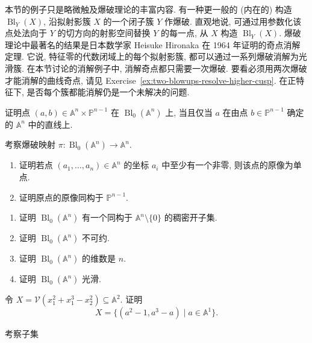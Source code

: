 本节的例子只是略微触及爆破理论的丰富内容. 有一种更一般的 (内在的) 构造 $\operatorname{Bl}_{Y}(X)$, 沿拟射影簇 $X$ 的一个闭子簇 $Y$ 作爆破. 直观地说, 可通过用参数化该点处法向于 $Y$ 的切方向的射影空间替换 $Y$ 的每一点, 从 $X$ 构造 $\operatorname{Bl}_{Y}(X)$. 爆破理论中最著名的结果是日本数学家 Heisuke Hironaka 在 1964 年证明的奇点消解定理. 它说, 特征零的代数闭域上的每个拟射影簇, 都可以通过一系列爆破消解为光滑簇. 在本节讨论的消解例子中, 消解奇点都只需要一次爆破. 要看必须用两次爆破才能消解的曲线奇点, 请见 Exercise~\ref{ex:two-blowups-resolve-higher-cusp}. 在正特征下, 是否每个簇都能消解仍是一个未解决的问题.

\BookExerciseHeading
\begin{BookExercises}
  \item\label{ex:blowup-incidence-condition-is-line-membership} 证明点 $(a,b)\in\mathbb{A}^{n}\times\mathbb{P}^{n-1}$ 在 $\operatorname{Bl}_{0}(\mathbb{A}^{n})$ 上, 当且仅当 $a$ 在由点 $b\in\mathbb{P}^{n-1}$ 确定的 $\mathbb{A}^{n}$ 中的直线上.
  \item\label{ex:fibres-of-blowup-of-affine-space-at-origin} 考察爆破映射 $\pi:\operatorname{Bl}_{0}(\mathbb{A}^{n})\to\mathbb{A}^{n}$.
  \begin{enumerate}
    \item 证明若点 $(a_{1},\ldots,a_{n})\in\mathbb{A}^{n}$ 的坐标 $a_{i}$ 中至少有一个非零, 则该点的原像为单点.
    \item 证明原点的原像同构于 $\mathbb{P}^{n-1}$.
  \end{enumerate}
  \item\label{ex:irreducibility-dimension-and-smoothness-of-affine-space-blowup}
  \begin{enumerate}
    \item 证明 $\operatorname{Bl}_{0}(\mathbb{A}^{n})$ 有一个同构于 $\mathbb{A}^{n}\setminus\{0\}$ 的稠密开子集.
    \item 证明 $\operatorname{Bl}_{0}(\mathbb{A}^{n})$ 不可约.
    \item 证明 $\operatorname{Bl}_{0}(\mathbb{A}^{n})$ 的维数是 $n$.
    \item 证明 $\operatorname{Bl}_{0}(\mathbb{A}^{n})$ 光滑.
  \end{enumerate}
  \item\label{ex:parametrize-nodal-affine-curve} 令 $X=\mathcal{V}(x_{1}^{2}+x_{1}^{3}-x_{2}^{2})\subseteq\mathbb{A}^{2}$. 证明
  \[
    X=\{(a^{2}-1,a^{3}-a)\mid a\in\mathbb{A}^{1}\}.
  \]
  \item\label{ex:closure-and-smoothness-of-nodal-curve-blowup} 考察子集

\end{BookExercises}
